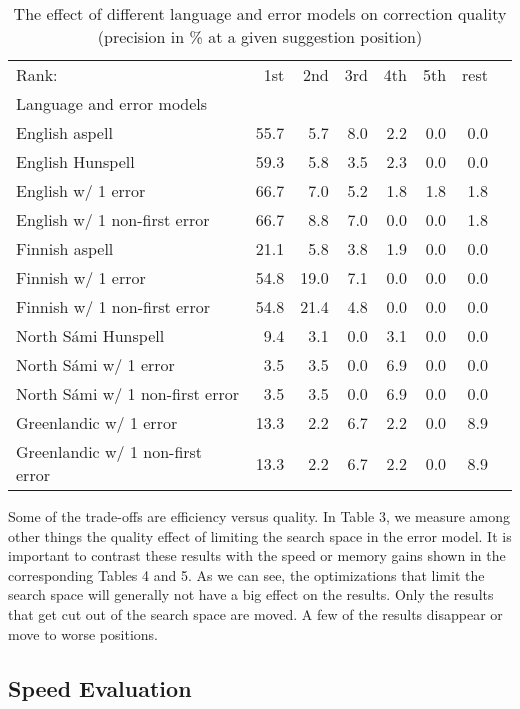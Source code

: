 \documentclass[postprint]{flammie}
\begin{document}
\begin{table}
    \caption{The effect of different language and error models on correction quality (precision in \% at a given suggestion position)}
    \begin{tabular}{lrrrrrrr}
            Rank: & 1st & 2nd & 3rd & 4th & 5th & rest \\
            Language and error models & & & & & & \\
English aspell & 55.7 & 5.7 & 8.0 & 2.2 & 0.0 & 0.0 & \\
English Hunspell & 59.3 & 5.8 & 3.5 & 2.3 & 0.0 & 0.0 \\
        English w/ 1 error & 66.7 & 7.0 & 5.2 & 1.8 & 1.8 & 1.8 \\
        English w/ 1 non-first error & 66.7 & 8.8 & 7.0 & 0.0 & 0.0 & 1.8 \\
        Finnish aspell & 21.1 & 5.8 & 3.8 & 1.9 & 0.0 & 0.0 \\
        Finnish w/ 1 error & 54.8 & 19.0 & 7.1 & 0.0 & 0.0 & 0.0 \\
        Finnish w/ 1 non-first error & 54.8 & 21.4 & 4.8 & 0.0 & 0.0 & 0.0 \\
        North Sámi Hunspell & 9.4 & 3.1 & 0.0 & 3.1 & 0.0 & 0.0 \\
        North Sámi w/ 1 error & 3.5 & 3.5 & 0.0 & 6.9 & 0.0 & 0.0 \\
        North Sámi w/ 1 non-first error & 3.5 & 3.5 & 0.0 & 6.9 & 0.0 & 0.0 \\
        Greenlandic w/ 1 error & 13.3 & 2.2 & 6.7 & 2.2 & 0.0 & 8.9 \\
        Greenlandic w/ 1 non-first error & 13.3 & 2.2 & 6.7 & 2.2 & 0.0 & 8.9
    \end{tabular}
\end{table}

Some of the trade-offs are efficiency versus quality. In Table 3, we measure
among other things the quality effect of limiting the search space in the error
model. It is important to contrast these results with the speed or memory gains
shown in the corresponding Tables 4 and 5. As we can see, the optimizations
that limit the search space will generally not have a big effect on the
results. Only the results that get cut out of the search space are moved. A few
of the results disappear or move to worse positions.

\subsection{Speed Evaluation}
\end{document}
